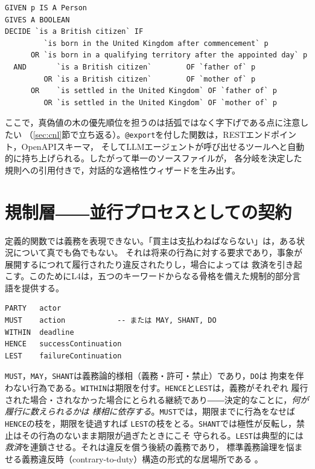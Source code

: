 \documentclass[11pt,a4paper]{ltjsarticle}
\newcommand{\code}[1]{\texttt{\small #1}}
\begin{document}
\begin{lstlisting}
GIVEN p IS A Person
GIVES A BOOLEAN
DECIDE `is a British citizen` IF
         `is born in the United Kingdom after commencement` p
      OR `is born in a qualifying territory after the appointed day` p
  AND       `is a British citizen`        OF `father of` p
         OR `is a British citizen`        OF `mother of` p
      OR    `is settled in the United Kingdom` OF `father of` p
         OR `is settled in the United Kingdom` OF `mother of` p
\end{lstlisting}

ここで，真偽値の木の優先順位を担うのは括弧ではなく字下げである点に注意したい
（\ref{sec:cnl}節で立ち返る）。\code{@export}を付した関数は，RESTエンドポイント，OpenAPIスキーマ，
そしてLLMエージェントが呼び出せるツールへと自動的に持ち上げられる。したがって単一のソースファイルが，
各分岐を決定した規則への引用付きで，対話的な適格性ウィザードを生み出す。

\section{規制層――並行プロセスとしての契約}\label{sec:regulative}
定義的関数では義務を表現できない。「買主は支払わねばならない」は，ある状況について真でも偽でもない。
それは将来の行為に対する要求であり，事象が展開するにつれて履行されたり違反されたりし，場合によっては
救済を引き起こす。このためにL4は，五つのキーワードからなる骨格を備えた規制的部分言語を提供する。

\begin{lstlisting}
PARTY   actor
MUST    action            -- または MAY, SHANT, DO
WITHIN  deadline
HENCE   successContinuation
LEST    failureContinuation
\end{lstlisting}

\code{MUST}，\code{MAY}，\code{SHANT}は義務論的様相（義務・許可・禁止）であり，\code{DO}は
拘束を伴わない行為である。\code{WITHIN}は期限を付す。\code{HENCE}と\code{LEST}は，義務がそれぞれ
履行された場合・されなかった場合にとられる継続であり――決定的なことに，\emph{何が履行に数えられるかは
様相に依存する}。\code{MUST}では，期限までに行為をなせば\code{HENCE}の枝を，期限を徒過すれば
\code{LEST}の枝をとる。\code{SHANT}では極性が反転し，禁止はその行為のないまま期限が過ぎたときにこそ
守られる。\code{LEST}は典型的には\emph{救済}を連鎖させる。それは違反を償う後続の義務であり，
標準義務論理を悩ませる義務違反時（contrary-to-duty）構造の形式的な居場所である
\cite{chisholm1963ctd,vonwright1951deontic}。
\end{document}
